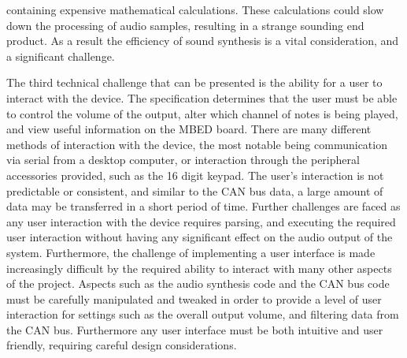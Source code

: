 containing expensive mathematical calculations. 
These calculations could slow down the processing of audio samples, resulting in
a strange sounding end product. As a result the efficiency of sound synthesis is 
a vital consideration, and a significant challenge. 
\par\bigskip\noindent
The third technical challenge that can be presented is the ability for a user 
to interact with the device.
The specification determines that the user must be able to control 
the volume of the output, alter which channel of notes is being played, 
and view useful information on the MBED board. 
There are many different methods of interaction with the device, the most 
notable being communication via serial from a desktop computer, or interaction 
through the peripheral accessories provided, such as the 16 digit keypad. 
The user's interaction is not predictable or consistent, and similar to the CAN 
bus data, a large amount of data may be transferred in a short period of time. 
Further challenges are faced as any user interaction with the device requires 
parsing, and executing the required user interaction without having any 
significant effect on the audio output of the system.
Furthermore, the challenge of implementing a user interface is made increasingly 
difficult by the required ability to interact with many other aspects of the 
project. 
Aspects such as the audio synthesis code and the CAN bus code must be carefully 
manipulated and tweaked in order to provide a level of user interaction for 
settings such as the overall output volume, and filtering data from the CAN bus. 
Furthermore any user interface must be both intuitive and user friendly, requiring
careful design considerations. 
